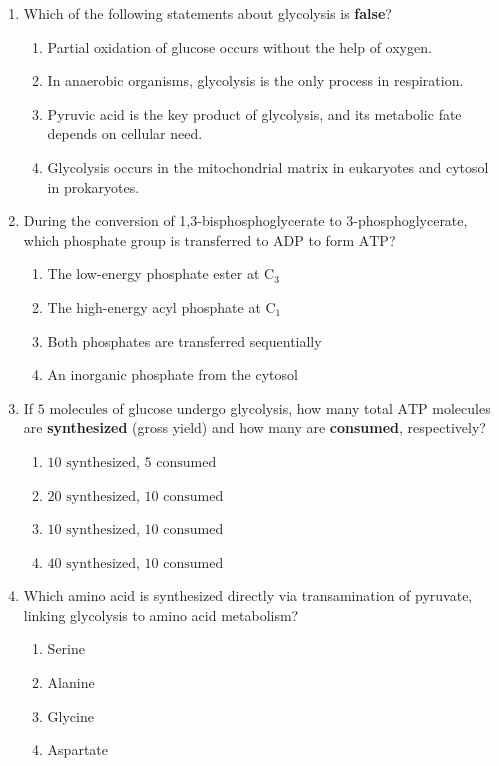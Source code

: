 \documentclass[11pt, a4paper]{article}
\begin{document}
\begin{enumerate}[label=\textbf{\arabic*.}]
\item Which of the following statements about glycolysis is \textbf{false}?
\begin{enumerate}[label=(\Alph*)]
    \item Partial oxidation of glucose occurs without the help of oxygen.
    \item In anaerobic organisms, glycolysis is the only process in respiration.
    \item Pyruvic acid is the key product of glycolysis, and its metabolic fate depends on cellular need.
    \item Glycolysis occurs in the mitochondrial matrix in eukaryotes and cytosol in prokaryotes.
\end{enumerate}

\item During the conversion of 1,3-bisphosphoglycerate to 3-phosphoglycerate, which phosphate group is transferred to $\text{ADP}$ to form $\text{ATP}$?
\begin{enumerate}[label=(\Alph*)]
    \item The low-energy phosphate ester at $\text{C}_3$
    \item The high-energy acyl phosphate at $\text{C}_1$
    \item Both phosphates are transferred sequentially
    \item An inorganic phosphate from the cytosol
\end{enumerate}

\item If $5\text{ molecules}$ of glucose undergo glycolysis, how many total $\text{ATP}$ molecules are \textbf{synthesized} (gross yield) and how many are \textbf{consumed}, respectively?
\begin{enumerate}[label=(\Alph*)]
    \item $10\text{ synthesized}$, $5\text{ consumed}$
    \item $20\text{ synthesized}$, $10\text{ consumed}$
    \item $10\text{ synthesized}$, $10\text{ consumed}$
    \item $40\text{ synthesized}$, $10\text{ consumed}$
\end{enumerate}

\item Which amino acid is synthesized directly via transamination of pyruvate, linking glycolysis to amino acid metabolism?
\begin{enumerate}[label=(\Alph*)]
    \item Serine
    \item Alanine
    \item Glycine
    \item Aspartate
\end{enumerate}


\end{enumerate}
\end{document}
